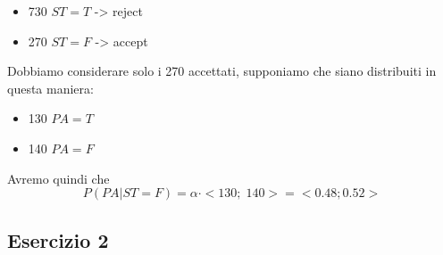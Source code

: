 \documentclass{article}
\begin{document}
\begin{itemize}
	\item 730 \(ST = T\) -> reject
	\item 270 \(ST = F\) -> accept
\end{itemize}

Dobbiamo considerare solo i 270 accettati, supponiamo che siano distribuiti in questa maniera:

\begin{itemize}
	\item 130 \(PA = T\)
	\item 140 \(PA = F\)
\end{itemize}

Avremo quindi che 
\[
	P(PA | ST = F) = \alpha \cdot < 130; \; 140 > = <0.48; 0.52>
\]

\pagebreak
\subsection{Esercizio 2}
\begin{center}
\end{center}
\end{document}

